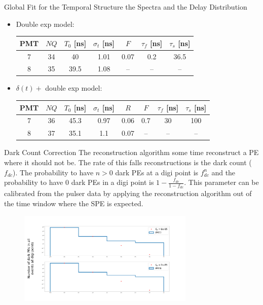 \documentclass{beamer}
\begin{document}
\begin{frame}{Global Fit for the Temporal Structure the Spectra and the Delay Distribution}
\begin{itemize}
\item Double exp model:
\begin{center}
\begin{tabular}{|c||c|c|c|c|c|c|} 
\hline
PMT & $NQ$ & $T_0$ [ns]& $\sigma_t$ [ns] & $F$ & $\tau_f$ [ns] & $\tau_s$ [ns]\\ 
\hline\hline
7 & 34 & 40 & 1.01  & 0.07 & 0.2 & 36.5 \\
\hline
8 & 35 & 39.5 & 1.08 & -- & -- & -- \\
\hline
\end{tabular}
\end{center} 

\item $\delta(t)+$ double exp model:
\begin{center}
\begin{tabular}{|c||c|c|c|c|c|c|c|} 
\hline
PMT & $NQ$ & $T_0$ [ns]& $\sigma_t$ [ns] & $R$ & $F$ & $\tau_f$ [ns] & $\tau_s$ [ns]\\ 
\hline\hline
7 & 36 & 45.3 & 0.97 & 0.06  & 0.7 & 30 & 100 \\
\hline
8 & 37 & 35.1 & 1.1& 0.07 & -- & -- & -- \\
\hline
\end{tabular}
\end{center} 
\end{itemize}
\end{frame}

\begin{frame}{Dark Count Correction}
The reconstruction algorithm some time reconstruct a PE where it should not be. The rate of this falls reconstructions is the dark count ($f_{dc}$). The probability to have $n>0$ dark PEs at a digi point is $f_{dc}^n$ and the probability to have 0 dark PEs in a digi point is $1-\frac{f_{dc}}{1-f_{dc}}$. This parameter can be calibrated from the pulser data by applying the reconstruction algorithm out of the time window where the SPE is expected.
\begin{figure}[h]
\includegraphics[width=0.75\textwidth]{f_dc.png}
\end{figure}
\end{frame}
\end{document}
